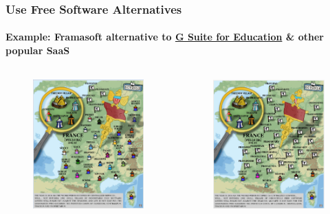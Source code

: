 \documentclass{beamer}
\begin{document}
	\begin{frame}
	\frametitle{Use Free Software Alternatives}
	\framesubtitle{Example: Framasoft alternative to \href{https://blog.google/topics/education/introducing-g-suite-education/}{G Suite for Education} \& other popular SaaS}
	\begin{columns}
	        	\begin{figure}[h]
               		\centering
                	\includegraphics[width=.8\textwidth]{./images/framasoft-gaulle}
        		\end{figure}
	        	\begin{figure}[h]
                	\centering
                	\includegraphics[width=.8\textwidth]{./images/framasoft-gaulle-201610}
        		\end{figure}
	\end{columns}
	\end{frame}
\end{document}
